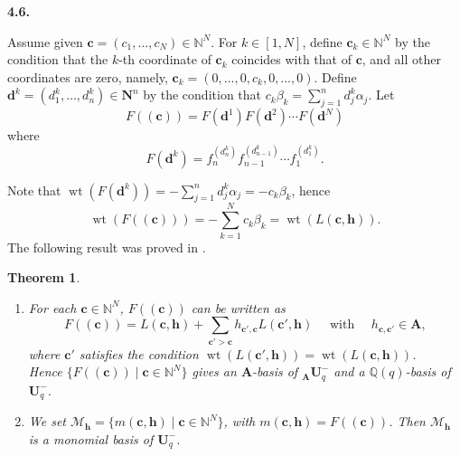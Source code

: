 \documentclass[12pt]{amsart}
\renewcommand\a{\alpha}
\renewcommand\b{\beta}
\renewcommand{\1}{\mathbb 1}
\newcommand{\QQ}{\mathbb Q}
\newcommand{\NN}{\mathbb N}
\newcommand\BA{\mathbf A}
\newcommand\BN{\mathbf N}
\newcommand\BU{\mathbf U}
\newcommand\Bh{\mathbf h}
\newcommand\Bc{\mathbf c}
\newcommand\Bd{\mathbf d}
\newcommand\SM{\mathscr{M}}
\newcommand\weit{\operatorname{wt}}
\numberwithin{equation}{section}
\newtheorem{thm}{Theorem}[section]
\def \para#1{\par\medskip\textbf{#1}
              \addtocounter{thm}{1}}
\begin{document}
\para{4.6.}
Assume given $\Bc = (c_1, \dots, c_N) \in \NN^N$.  For $k \in [1,N]$,
define $\Bc_k \in \NN^N$ by the condition that the $k$-th coordinate of $\Bc_k$
coincides with that of $\Bc$, and all other coordinates are zero, namely,
$\Bc_k = (0, \dots, 0, c_k, 0, \dots, 0)$. 
Define $\Bd^k = (d_1^k, \dots, d_n^k) \in \BN^n$ by the condition that
$c_k\b_k = \sum_{j = 1}^nd_j^k\a_j$.
Let
\begin{equation*}
\tag{4.6.1}  
F((\Bc)) = F(\Bd^1)F(\Bd^2)\cdots F(\Bd^N)
\end{equation*}  
where
\begin{equation*}
\tag{4.6.2}  
F(\Bd^k) = f_n^{(d_n^k)}f_{n-1}^{(d_{n-1}^k)}\cdots f_1^{(d_1^k)}.
\end{equation*}  

Note that $\weit(F(\Bd^k)) = -\sum_{j=1}^n d_j^k\a_j = -c_k\b_k$,
hence
\begin{equation*}
  \weit(F((\Bc))) = -\sum_{k = 1}^N c_k\b_k = \weit(L(\Bc,\Bh)).
\end{equation*}  
The following result was proved in \cite [7.8]{L-can}.

\begin{thm}  %
\begin{enumerate}
\item 
For each $\Bc \in \NN^N$, $F((\Bc))$ can be written as
\begin{equation*}
  F((\Bc)) = L(\Bc, \Bh) + \sum_{\Bc' > \Bc}h_{\Bc',\Bc}L(\Bc',\Bh)
                 \quad\text{ with  }  \quad h_{\Bc,\Bc'} \in \BA,
\end{equation*}
where $\Bc'$ satisfies the condition $\weit(L(\Bc',\Bh)) = \weit(L(\Bc,\Bh))$.
\\
Hence  $\{ F((\Bc)) \mid \Bc \in \NN^N\}$
gives an $\BA$-basis of ${}_{\BA}\BU_q^-$ and a $\QQ(q)$-basis of $\BU_q^-$. 
\item
We set $\SM_{\Bh} = \{ m(\Bc,\Bh) \mid \Bc \in \NN^N\}$, with $m(\Bc, \Bh) = F((\Bc))$.  
Then $\SM_{\Bh}$ is a monomial basis of $\BU_q^-$. 
\end{enumerate}
\end{thm}
\end{document}
